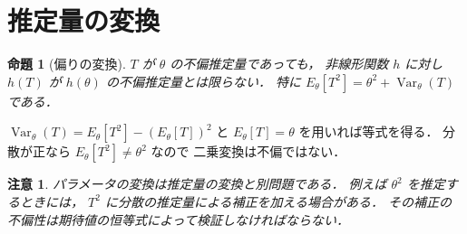 \documentclass[a5paper,10pt,onecolumn]{jsarticle}
\makeatletter
\theoremstyle{mathnotetheorem}
\newtheorem{proposition}[theorem]{命題}
\newtheorem{remark}[theorem]{注意}
\renewcommand{\proofname}{証明}
\renewenvironment{proof}[1][\proofname]{%
  \par\pushQED{\qed}\normalfont\topsep4\p@\@plus2\p@\relax
  \trivlist\item[\hskip\labelsep\bfseries #1]\ignorespaces
}{\popQED\endtrivlist\@endpefalse}
\makeatother
\begin{document}
\section{推定量の変換}
\begin{proposition}[偏りの変換]
$T$ が $\theta$ の不偏推定量であっても，
非線形関数 $h$ に対し $h(T)$ が
$h(\theta)$ の不偏推定量とは限らない．
特に $E_\theta[T^2]=\theta^2+\operatorname{Var}_\theta(T)$ である．
\end{proposition}
\begin{proof}
$\operatorname{Var}_\theta(T)
 =E_\theta[T^2]-(E_\theta[T])^2$ と
$E_\theta[T]=\theta$ を用いれば等式を得る．
分散が正なら $E_\theta[T^2]\ne\theta^2$ なので
二乗変換は不偏ではない．
\end{proof}
\begin{remark}
パラメータの変換は推定量の変換と別問題である．
例えば $\theta^2$ を推定するときには，
$T^2$ に分散の推定量による補正を加える場合がある．
その補正の不偏性は期待値の恒等式によって検証しなければならない．
\end{remark}
\end{document}
